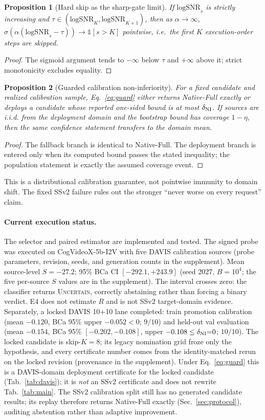 \documentclass[letterpaper]{article}
\newcommand{\lsnr}{\mathrm{logSNR}}
\newtheorem{proposition}{Proposition}
\begin{document}
\begin{proposition}[Hard skip as the sharp-gate limit]\label{prop:zero}
If $\lsnr_s$ is strictly increasing and
$\tau\in(\lsnr_K,\lsnr_{K+1})$, then as $\alpha\to\infty$,
$\sigma(\alpha(\lsnr_s-\tau))\to\mathbb 1[s>K]$ pointwise, i.e.\ the
first $K$ execution-order steps are skipped.
\end{proposition}
\begin{proof}
The sigmoid argument tends to $-\infty$ below $\tau$ and $+\infty$ above
it; strict monotonicity excludes equality.
\end{proof}

\begin{proposition}[Guarded calibration non-inferiority]\label{prop:guard}
For a fixed candidate and realized calibration sample, Eq.~\eqref{eq:guard}
either returns Native-Full exactly or deploys a candidate whose reported
one-sided bound is at most $\delta_{\rm NI}$. If sources are i.i.d. from the
deployment domain and the bootstrap bound has coverage $1-\eta$, then the
same confidence statement transfers to the domain mean.
\end{proposition}
\begin{proof}
The fallback branch is identical to Native-Full. The deployment branch is
entered only when its computed bound passes the stated inequality; the
population statement is exactly the assumed coverage event.
\end{proof}
This is a distributional calibration guarantee, not pointwise immunity to
domain shift. The fixed SSv2 failure rules out the stronger ``never worse on
every request'' claim.

\paragraph{Current execution status.}
The selector and paired estimator are implemented and tested.
The signed probe was executed on CogVideoX-5b-I2V with five DAVIS
calibration sources (probe parameters, revision, seeds, and generation
counts in the supplement).
Mean source-level $S{=}-27.2$; 95\% BCa CI $[-292.1, +243.9]$ (seed 2027,
$B{=}10^4$; the five per-source $S$ values are in the supplement).
The interval crosses zero: the classifier returns \textsc{Uncertain},
correctly abstaining rather than forcing a binary verdict.
E4 does not estimate $R$ and is not SSv2 target-domain evidence.
Separately, a locked DAVIS 10{+}10 lane completed: train promotion
calibration (mean $-0.120$, BCa 95\% upper $-0.052{<}0$; $9/10$) and
held-out val evaluation (mean $-0.154$, BCa 95\%
$[-0.202,-0.108]$, upper $-0.108\le\delta_{\rm NI}{=}0$; $10/10$).
The locked candidate is skip-$K{=}8$; its legacy nomination grid froze
only the hypothesis, and every certificate number comes from the
identity-matched rerun on the locked revision (provenance in the
supplement).
Under Eq.~\eqref{eq:guard} this is a DAVIS-domain deployment certificate
for the locked candidate (Tab.~\ref{tab:davis}); it is \emph{not} an SSv2
certificate and does not rewrite Tab.~\ref{tab:main}.
The SSv2 calibration split still has no generated candidate results; its
replay therefore returns Native-Full exactly (Sec.~\ref{sec:protocol}),
auditing abstention rather than adaptive improvement.
\end{document}
